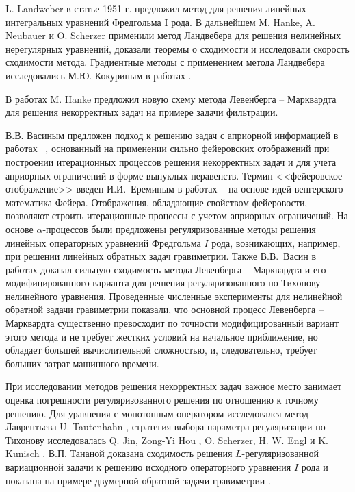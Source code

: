 {L. Landweber в статье \cite{Lan1951} 1951 г. предложил метод для решения линейных интегральных уравнений Фредгольма I рода. В дальнейшем M. Hanke, A. Neubauer и O. Scherzer \cite{HanNeuSch1995,Neu2000,NeuSch1995_2} применили метод Ландвебера для решения нелинейных нерегулярных уравнений, доказали теоремы о сходимости и исследовали скорость сходимости метода. Градиентные методы с применением метода Ландвебера исследовались М.Ю. Кокуриным в работах \cite{Kok2010_1,Kok2010_2}.

В работах \cite{Han1997,Han2010} M. Hanke предложил новую схему метода Левенберга -- Марквардта для решения некорректных задач на примере задачи фильтрации.

В.В. Васиным предложен подход к решению задач с априорной информацией в работах ~\cite{Vas1982, Vas1988,VasAge1993, VasEre2009}, основанный на применении сильно фейеровских отображений при построении итерационных процессов решения некорректных задач и для учета априорных ограничений в форме выпуклых неравенств. Термин <<фейеровское отображение>> введен И.И.~Ереминым в работах ~\cite{Ere1965, Ere1966, Ere1968} на основе идей венгерского математика Фейера. Отображения, обладающие свойством фейеровости, позволяют строить итерационные процессы с учетом априорных ограничений. На основе $\alpha$-процессов были предложены регуляризованные методы решения линейных операторных уравнений Фредгольма $I$ рода, возникающих, например, при решении линейных обратных задач гравиметрии. Также В.В.~Васин в работах \cite{VasPer_2011,Vasin_2012} доказал сильную сходимость метода Левенберга -- Марквардта и его модифицированного варианта для решения регуляризованного по Тихонову нелинейного уравнения. Проведенные численные эксперименты для нелинейной обратной задачи гравиметрии показали, что основной процесс Левенберга -- Марквардта существенно превосходит по точности модифицированный вариант этого метода и не требует жестких условий на начальное приближение, но обладает большей вычислительной сложностью, и, следовательно, требует больших затрат машинного времени.

При исследовании методов решения некорректных задач важное место занимает оценка погрешности регуляризованного решения по отношению к точному решению. Для уравнения с монотонным оператором исследовался метод Лаврентьева U. Tautenhahn \cite{Tau2002,Tau2004}, стратегия выбора параметра регуляризации по Тихонову исследовалась Q. Jin, Zong-Yi Hou \cite{JinZon1997,JinZon1999}, O. Scherzer, H. W. Engl и K. Kunisch \cite{SchEngKun1993}. В.П. Тананой доказана сходимость решения $L$-регуляризованной вариационной задачи к решению исходного операторного уравнения $I$ рода и показана на примере двумерной обратной задачи гравиметрии \cite{Tan2003_2}.

}
